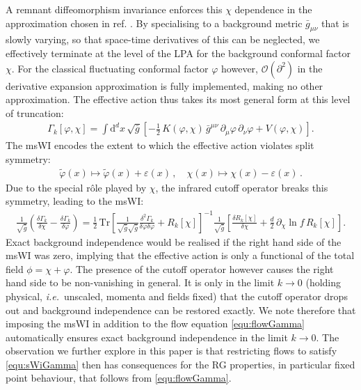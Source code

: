 \documentclass[11pt,draft]{book} %
\newcommand\ie{\textit{i.e.}\ }
\newcommand{\eps}{\varepsilon}
\newcommand{\vp}{\varphi}
\newcommand{\dclnf}{\,\partial_\chi\! \ln\! f \,}
\begin{document}
A remnant diffeomorphism invariance enforces this $\chi$ dependence in the approximation chosen in
ref. \cite{Dietz:2015owa}.
By specialising to a background metric ${\bar g}_{\mu\nu}$ that is slowly varying,
so that space-time derivatives of this can be neglected, we effectively terminate at the level of
the LPA for the background conformal factor $\chi$.
For the classical fluctuating conformal factor $\vp$ however,
$\mathcal{O}(\partial^2)$ in the derivative expansion approximation is fully implemented,
making no other approximation.
The effective action thus takes its most general form at this level of truncation:
\begin{align}
  \Gamma_k[\varphi, \chi] = \int \mathrm d^dx \, \sqrt{\bar g}
  \left[
    - \frac{1}{2} \, K(\varphi,\chi) \, \bar g^{\mu\nu} \, \partial_{\mu}\varphi \, \partial_{\nu}\varphi
    + V(\varphi,\chi)
  \right] .
  \label{trunc}
\end{align}
The msWI encodes the extent to which the effective action violates split symmetry:
\begin{align}
  \tilde \vp(x) \mapsto \tilde \vp(x) + \eps(x) \,, \quad \chi(x) \mapsto \chi(x) -\eps(x)\,.
  \label{equ:split-symmetry}
\end{align}
Due to the special r\^ole played by $\chi$, the infrared cutoff operator breaks this symmetry,
leading to the msWI:
\begin{align}
  \frac{1}{\sqrt{\bar g}}
  \left(
    \frac{\delta\Gamma_k}{\delta \chi} - \frac{\delta \Gamma_k}{\delta \vp}
  \right)
  = \frac{1}{2} \, \mathrm{Tr}
  \left[
    \frac{1}{\sqrt{\bar g}\sqrt{\bar g}}\frac{\delta^2\Gamma_k}
    {\delta \vp \delta \vp}+ R_k[\chi]
  \right]^{-1}
  \frac{1}{\sqrt{\bar g}}
  \left[
    \frac{\delta R_k[\chi] }{\delta \chi}+\frac{d}{2}\dclnf R_k[\chi]
  \right] .
  \label{equ:sWiGamma}
\end{align}
Exact background independence would be realised if the right hand side of the msWI was zero,
implying that the effective action is only a functional of the total field $\phi = \chi + \vp$.
The presence of the cutoff operator however causes the right hand side to be non-vanishing in general.
It is only in the limit $k\rightarrow0$ (holding physical, \ie unscaled,
momenta and fields fixed) that the cutoff operator drops out and background independence can be
restored exactly. We note therefore that imposing the msWI in addition to the flow equation
\eqref{equ:flowGamma} automatically ensures exact background independence in the limit $k\rightarrow0$.
The observation we further explore in this paper is that restricting flows to
satisfy \eqref{equ:sWiGamma} then has consequences for the RG properties,
in particular fixed point behaviour, that follows from \eqref{equ:flowGamma}.
\end{document}

